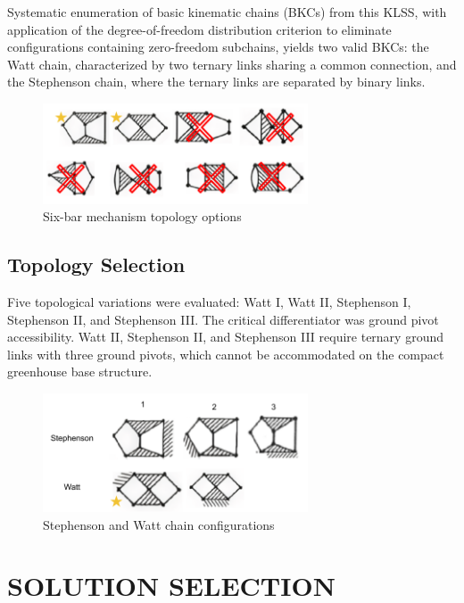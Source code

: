 \documentclass[12pt]{article}
\begin{document}
Systematic enumeration of basic kinematic chains (BKCs) from this KLSS, with application of the degree-of-freedom distribution criterion to eliminate configurations containing zero-freedom subchains, yields two valid BKCs: the Watt chain, characterized by two ternary links sharing a common connection, and the Stephenson chain, where the ternary links are separated by binary links.

\begin{figure}[H]
    \centering
    \includegraphics[width=0.7\textwidth]{../03_Images/6 Bar options.png}
    \caption{Six-bar mechanism topology options}
    \label{fig:six_bar_options}
\end{figure}

\subsection*{Topology Selection}

Five topological variations were evaluated: Watt I, Watt II, Stephenson I, Stephenson II, and Stephenson III. The critical differentiator was ground pivot accessibility. Watt II, Stephenson II, and Stephenson III require ternary ground links with three ground pivots, which cannot be accommodated on the compact greenhouse base structure.

\begin{figure}[H]
    \centering
    \includegraphics[width=0.7\textwidth]{../03_Images/Stephenson and Watt.png}
    \caption{Stephenson and Watt chain configurations}
    \label{fig:stephenson_watt}
\end{figure}

\section*{SOLUTION SELECTION}
\end{document}
